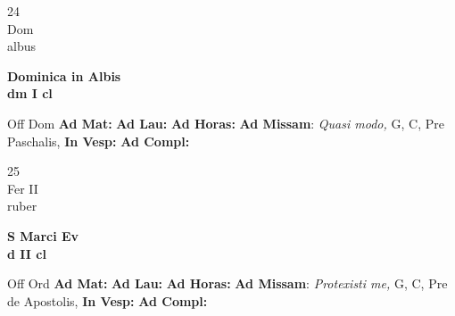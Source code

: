 \documentclass[10pt, openany]{book}
\begin{document}
        \begin{center}
            \begin{minipage}{3.5in}
                \vspace{2em}
                \begin{minipage}{0.5in}
                    {\Huge 24} \\
                    {\normalsize Dom} \\
                    {\normalsize albus}
                \end{minipage}
                \begin{minipage}{3.0in}
                    \textbf{ \large Dominica in Albis \\
                    \textnormal{\normalsize dm I cl}} \\ 
                \end{minipage}
                \begin{justify}Off Dom
                    \textbf{Ad Mat: }
                    \textbf{Ad Lau: }
                    \textbf{Ad Horas: }\textbf{Ad Missam}: \textit{Quasi modo,} G, C, Pre Paschalis,  
                    \textbf{In Vesp: }
                    \textbf{Ad Compl: }
                \end{justify}
            \end{minipage}
        \end{center}
    
        \begin{center}
            \begin{minipage}{3.5in}
                \vspace{2em}
                \begin{minipage}{0.5in}
                    {\Huge 25} \\
                    {\normalsize Fer II} \\
                    {\normalsize ruber}
                \end{minipage}
                \begin{minipage}{3.0in}
                    \textbf{ \large S Marci Ev \\
                    \textnormal{\normalsize d II cl}} \\ 
                \end{minipage}
                \begin{justify}Off Ord
                    \textbf{Ad Mat: }
                    \textbf{Ad Lau: }
                    \textbf{Ad Horas: }\textbf{Ad Missam}: \textit{Protexisti me,} G, C, Pre de Apostolis,  
                    \textbf{In Vesp: }
                    \textbf{Ad Compl: }
                \end{justify}
            \end{minipage}
        \end{center}
    
\end{document}
